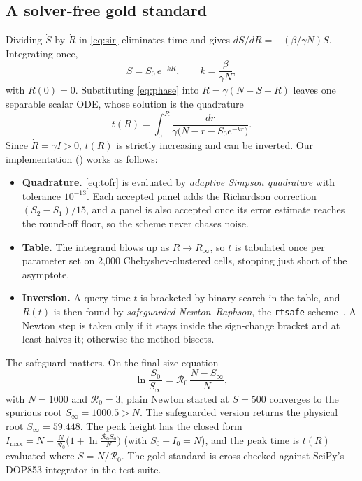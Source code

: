 \documentclass[sigconf]{acmart}
\begin{document}
\subsection{A solver-free gold standard}
\label{sec:gold}
Dividing $\dot S$ by $\dot R$ in \eqref{eq:sir} eliminates time and gives
$dS/dR=-(\beta/\gamma N)S$. Integrating once,
\begin{equation}
  S = S_0\,e^{-kR},\qquad k=\frac{\beta}{\gamma N},
  \label{eq:phase}
\end{equation}
with $R(0)=0$. Substituting \eqref{eq:phase} into
$\dot R=\gamma(N-S-R)$ leaves one separable scalar ODE, whose solution
is the quadrature~\cite{prodanov2021}
\begin{equation}
  t(R)=\int_0^{R}\frac{dr}{\gamma\big(N-r-S_0e^{-kr}\big)}.
  \label{eq:tofr}
\end{equation}
Since $\dot R=\gamma I>0$, $t(R)$ is strictly increasing and can be
inverted. Our implementation () works as
follows:
\begin{itemize}
  \item \textbf{Quadrature.} \eqref{eq:tofr} is evaluated by
    \emph{adaptive Simpson quadrature} with tolerance $10^{-13}$. Each
    accepted panel adds the Richardson correction $(S_2-S_1)/15$, and a
    panel is also accepted once its error estimate reaches the round-off
    floor, so the scheme never chases noise.
  \item \textbf{Table.} The integrand blows up as $R\to R_\infty$, so
    $t$ is tabulated once per parameter set on 2{,}000
    Chebyshev-clustered cells, stopping just short of the asymptote.
  \item \textbf{Inversion.} A query time $t$ is bracketed by binary
    search in the table, and $R(t)$ is then found by \emph{safeguarded
    Newton--Raphson}, the \texttt{rtsafe} scheme~\cite{press2007}. A
    Newton step is taken only if it stays inside the sign-change bracket
    and at least halves it; otherwise the method bisects.
\end{itemize}
The safeguard matters. On the final-size equation
\begin{equation}
  \ln\frac{S_0}{S_\infty}=\mathcal R_0\,\frac{N-S_\infty}{N},
  \label{eq:finalsize}
\end{equation}
with $N=1000$ and $\mathcal R_0=3$, plain Newton started at $S=500$
converges to the spurious root $S_\infty=1000.5>N$. The safeguarded
version returns the physical root $S_\infty=59.448$. The peak height
has the closed form
$I_{\max}=N-\tfrac{N}{\mathcal R_0}\big(1+\ln\tfrac{\mathcal R_0S_0}{N}\big)$
(with $S_0+I_0=N$), and the peak time is $t(R)$ evaluated where
$S=N/\mathcal R_0$. The gold standard is cross-checked against SciPy's
DOP853 integrator in the test suite.
\end{document}
